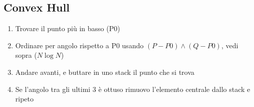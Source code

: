 \subsection{Convex Hull}
\begin{enumerate}
    \item Trovare il punto più in basso (P0)
    \item Ordinare per angolo rispetto a P0 usando $(P-P0)\wedge(Q-P0)$, vedi sopra ($N\log N$)
    \item Andare avanti, e buttare in uno stack il punto che si trova
    \item Se l’angolo tra gli ultimi 3 è ottuso rimuovo l’elemento centrale dallo stack e ripeto
\end{enumerate}

